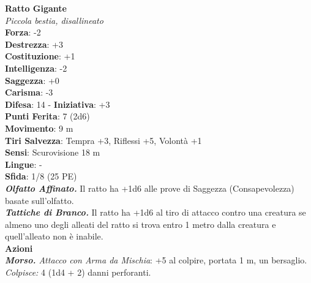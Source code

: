 \begin{multicols}{2}
\medskip\textbf{Ratto Gigante}\\
\emph{Piccola bestia, disallineato}\\
\textbf{Forza}: -2\\
\textbf{Destrezza}: +3\\
\textbf{Costituzione}: +1\\
\textbf{Intelligenza}: -2\\
\textbf{Saggezza}: +0\\
\textbf{Carisma}: -3\\
\textbf{Difesa}: 14 - \textbf{Iniziativa}: +3\\
\textbf{Punti Ferita}: 7 (2d6)\\
\textbf{Movimento}: 9 m\\
\textbf{Tiri Salvezza}: Tempra +3, Riflessi +5, Volontà +1 \\
\textbf{Sensi}: Scurovisione 18 m\\
\textbf{Lingue}: -\\
\textbf{Sfida}: 1/8 (25 PE)\smallskip\\
\emph{\textbf{Olfatto Affinato.}} Il ratto ha +1d6 alle prove di Saggezza (Consapevolezza) basate sull'olfatto.\\
\emph{\textbf{Tattiche di Branco.}} Il ratto ha +1d6 al tiro di attacco contro una creatura se almeno uno degli alleati del ratto si trova entro 1 metro dalla creatura e quell'alleato non è inabile. \\
\smallskip\textbf{Azioni}\\
\emph{\textbf{Morso.} Attacco con Arma da Mischia}: +5 al colpire, portata 1 m, un bersaglio.\\
\emph{Colpisce:} 4 (1d4 + 2) danni perforanti.\\


\end{multicols}
